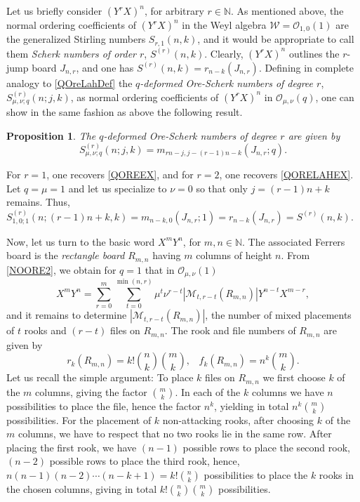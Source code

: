 \documentclass[10pt]{amsart}
\newtheorem{proposition}[theorem]{Proposition}%
\begin{document}
Let us briefly consider $(Y^rX)^n$, for arbitrary $r\in \mathbb{N}$. As mentioned above, the normal ordering coefficients of $(Y^rX)^n$ in the Weyl algebra ${\mathcal W}={\mathcal O}_{1,0}(1)$ are the generalized Stirling numbers $S_{r,1}(n,k)$, and it would be appropriate to call them {\em Scherk numbers of order $r$}, $S^{(r)}(n,k)$. Clearly, $(Y^rX)^n$ outlines the $r$-jump board $J_{n,r}$, and one has $S^{(r)}(n,k)=r_{n-k}(J_{n,r})$. Defining in complete analogy to \eqref{QOreLahDef} the {\em $q$-deformed Ore-Scherk numbers of degree $r$}, $S^{(r)}_{\mu,\nu;q}(n;j,k)$, as normal ordering coefficients of $(Y^rX)^n$ in ${\mathcal O}_{\mu,\nu}(q)$, one can show in the same fashion as above the following result.
\begin{proposition} The $q$-deformed Ore-Scherk numbers of degree $r$ are given by
\begin{equation}\label{OREScherk}
S^{(r)}_{\mu,\nu;q}(n;j,k)=m_{rn-j,j-(r-1)n-k}(J_{n,r};q).
\end{equation}
\end{proposition}
For $r=1$, one recovers \eqref{QOREEX}, and for $r=2$, one recovers \eqref{QORELAHEX}. Let $q=\mu=1$ and let us specialize to $\nu=0$ so that only $j=(r-1)n+k$ remains. Thus, $S^{(r)}_{1,0;1}(n;(r-1)n+k,k)=m_{n-k,0}(J_{n,r};1)=r_{n-k}(J_{n,r})=S^{(r)}(n,k)$.

Now, let us turn to the basic word $X^mY^n$, for $m,n\in \mathbb{N}$. The associated Ferrers board is the {\em rectangle board} $R_{m,n}$ having $m$ columns of height $n$. From \eqref{NOORE2}, we obtain for $q=1$ that in ${\mathcal O}_{\mu,\nu}(1)$
\begin{equation}\label{BasicCR}
X^mY^n = \sum_{r=0}^{m}\sum_{t=0}^{\min(n, r)} \mu^{t} \nu^{r-t} | {\mathcal M}_{t,r-t}(R_{m,n})| Y^{n-t}X^{m-r},
\end{equation}
and it remains to determine $| {\mathcal M}_{t,r-t}(R_{m,n})|$, the number of mixed placements of $t$ rooks and $(r-t)$ files on $R_{m,n}$. The rook and file numbers of $R_{m,n}$ are given by
\begin{equation}\label{Rectangle}
r_k(R_{m,n})=k! \binom{n}{k}\binom{m}{k}, \,\,\,\,\,  f_k(R_{m,n})= n^k \binom{m}{k}. 
\end{equation}
Let us recall the simple argument: To place $k$ files on $R_{m,n}$ we first choose $k$ of the $m$ columns, giving the factor $\binom{m}{k}$. In each of the $k$ columns we have $n$ possibilities to place the file, hence the factor $n^k$, yielding in total $ n^k \binom{m}{k}$ possibilities. For the placement of $k$ non-attacking rooks, after choosing $k$ of the $m$ columns,  we have to respect that no two rooks lie in the same row. After placing the first rook, we have $(n-1)$ possible rows to place the second rook, $(n-2)$ possible rows to place the third rook, hence, $n(n-1)(n-2)\cdots (n-k+1)=k!\binom{n}{k}$ possibilities to place the $k$ rooks in the chosen columns, giving in total $k! \binom{n}{k}\binom{m}{k}$ possibilities.  
\end{document}

